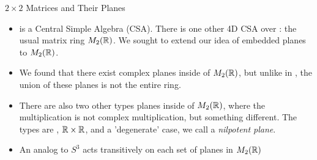\documentclass[t,slidestop,compress,mathserif,color=option,hyperref={pdfstartview={Fit},pdfpagelayout={SinglePage},pdfpagemode={UseOutlines}}]{beamer}
\begin{document}
\begin{frame}{$2 \times 2$ Matrices and Their Planes}
\begin{itemize}
    \item \bH is a Central Simple Algebra (CSA). There is one other 4D CSA over \bR: the usual matrix ring $M_2(\protect\mathbb{R})$. We sought to extend our idea of embedded planes to $M_2(\protect\mathbb{R})$. 
    \item We found that there exist complex planes inside of $M_2(\protect\mathbb{R})$, but unlike in \bH, the union of these planes is \alert{not} the entire ring.
    \item There are also two other types planes inside of $M_2(\protect\mathbb{R})$, where the multiplication is not complex multiplication, but something different. The types are \bC, $\protect\mathbb{R} \times \protect\mathbb{R}$, and a 'degenerate' case, we call a {\it nilpotent plane}.
    \item An analog to $S^3$ acts transitively on each set of planes in $M_2(\protect\mathbb{R})$
\end{itemize}
\end{frame}
\end{document}
